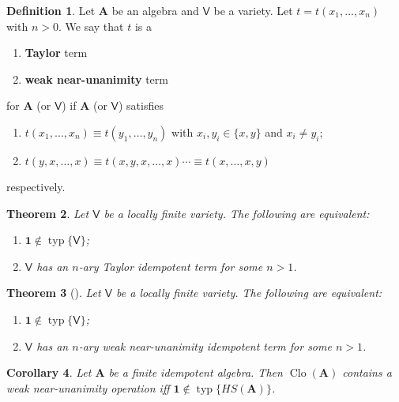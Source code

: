 \documentclass{amsart}
\theoremstyle{plain}
\newtheorem{theorem}{Theorem}[section]
\newtheorem{corollary}[theorem]{Corollary}
\theoremstyle{definition}
\newtheorem{definition}[theorem]{Definition}
\theoremstyle{remark}
\DeclareMathOperator{\Clo}{Clo}
\DeclareMathOperator{\typ}{typ}
\begin{document}
\begin{definition}
    Let $\mathbf{A}$ be an algebra and $\mathsf{V}$ be a variety. 
    Let $t=t(x_1, \ldots, x_n)$ with $n >0$.
    We say that $t$ is a
    \begin{enumerate}
        \item \textbf{Taylor} term 
        \item \textbf{weak near-unanimity} term 
    \end{enumerate}
    for $\mathbf{A}$ (or $\mathsf{V}$) if $\mathbf{A}$ (or $\mathsf{V}$) satisfies 
    \begin{enumerate}
        \item $t(x_1, \ldots, x_n) \equiv t(y_1, \ldots, y_n)$ with $x_i, y_i \in \{x,y\}$ and $x_i \neq y_i$;
        \item $t(y, x, \ldots, x) \equiv t(x,y,x,\ldots, x) \cdots \equiv t(x, \ldots, x,y)$
    \end{enumerate}
    respectively. 
\end{definition}

\begin{theorem}
    Let $\mathsf{V}$ be a locally finite variety. The following are equivalent: 
    \begin{enumerate}
        \item $\mathbf{1} \notin \typ\{\mathsf{V}\}$; 
        \item $\mathsf{V}$ has an $n$-ary Taylor idempotent term for some $n >1$. 
    \end{enumerate}
\end{theorem}

\begin{theorem}
    [\cite{wnu}]
    Let $\mathsf{V}$ be a locally finite variety. The following are equivalent: 
    \begin{enumerate}
        \item $\mathbf{1} \notin \typ\{\mathsf{V}\}$; 
        \item $\mathsf{V}$ has an $n$-ary weak near-unanimity idempotent term for some $n >1$. 
    \end{enumerate}
\end{theorem}

\begin{corollary}
    Let $\mathbf{A}$ be a finite idempotent algebra. 
    Then $\Clo(\mathbf{A})$ contains a weak near-unanimity operation iff $\mathbf{1} \notin \typ\{HS(\mathbf{A})\}$. 
\end{corollary}
\end{document}
